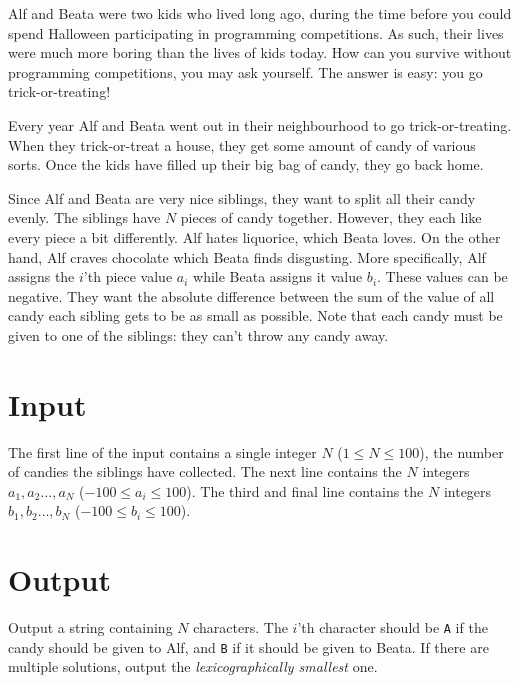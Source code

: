 
\noindent
Alf and Beata were two kids who lived long ago, during the time before you could spend Halloween participating in programming competitions.
As such, their lives were much more boring than the lives of kids today.
How can you survive without programming competitions, you may ask yourself.
The answer is easy: you go trick-or-treating!

Every year Alf and Beata went out in their neighbourhood to go trick-or-treating.
When they trick-or-treat a house, they get some amount of candy of various sorts.
Once the kids have filled up their big bag of candy, they go back home.

Since Alf and Beata are very nice siblings, they want to split all their candy evenly.
The siblings have $N$ pieces of candy together.
However, they each like every piece a bit differently.
Alf hates liquorice, which Beata loves.
On the other hand, Alf craves chocolate which Beata finds disgusting.
More specifically, Alf assigns the $i$'th piece value $a_i$ while Beata assigns it value $b_i$.
These values can be negative.
They want the absolute difference between the sum of the value of all candy each sibling gets to be as small as possible.
Note that each candy must be given to one of the siblings: they can't throw any candy away.

\section*{Input}
The first line of the input contains a single integer $N$ ($1 \le N \le 100$), the number of candies the siblings have collected.
The next line contains the $N$ integers $a_1, a_2 \dots, a_N$ ($-100 \le a_i \le 100$).
The third and final line contains the $N$ integers $b_1, b_2 \dots, b_N$ ($-100 \le b_i \le 100$).

\section*{Output}
Output a string containing $N$ characters.
The $i$'th character should be \texttt{A} if the candy should be given to Alf, and \texttt{B} if it should be given to Beata.
If there are multiple solutions, output the \emph{lexicographically smallest} one.
